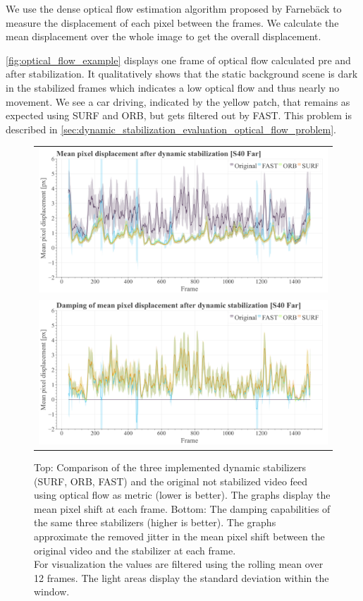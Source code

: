 We use the dense optical flow estimation algorithm proposed by Farnebäck \cite{farnback10.1007/3-540-45103-X_50,opencv_library} to measure the displacement of each pixel between the frames. 
We calculate the mean displacement over the whole image to get the overall displacement. 

\autoref{fig:optical_flow_example} displays one frame of optical flow calculated pre and after stabilization.
It qualitatively shows that the static background scene is dark in the stabilized frames which indicates a low optical flow and thus nearly no movement. 
We see a car driving, indicated by the yellow patch, that remains as expected using SURF and ORB, but gets filtered out by FAST. This problem is described in \autoref{sec:dynamic_stabilization_evaluation_optical_flow_problem}.     

\begin{figure}[t]
    \centering
    \begin{tabular}{c}
      \includegraphics[width=0.9\linewidth]{diagrams/optical_flow/mean_pixel_shifts_after_dynamic_stabilization_s40_far.png}    \\  
      \includegraphics[width=0.9\linewidth]{diagrams/optical_flow/damping_mean_pixel_shifts_after_dynamic_stabilization_s40_far.png}    
\end{tabular}
    \caption{Top: 
        Comparison of the three implemented dynamic stabilizers (SURF, ORB, FAST) and the original not stabilized video feed using optical flow as metric (lower is better).
        The graphs display the mean pixel shift at each frame. 
        Bottom: 
        The damping capabilities of the same three stabilizers (higher is better). 
        The graphs approximate the removed jitter in the mean pixel shift between the original video and the stabilizer at each frame.\\
        For visualization the values are filtered using the rolling mean over 12 frames. 
        The light areas display the standard deviation within the window.
    }
    \label{fig:dynamic_stabilization_s40_far}
\end{figure}

